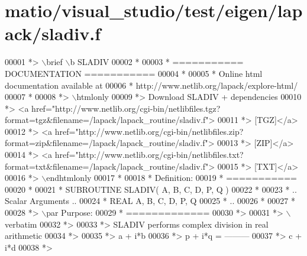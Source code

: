 \hypertarget{matio_2visual__studio_2test_2eigen_2lapack_2sladiv_8f_source}{}\section{matio/visual\+\_\+studio/test/eigen/lapack/sladiv.f}
\label{matio_2visual__studio_2test_2eigen_2lapack_2sladiv_8f_source}

\begin{DoxyCode}
00001 \textcolor{comment}{*> \(\backslash\)brief \(\backslash\)b SLADIV}
00002 \textcolor{comment}{*}
00003 \textcolor{comment}{*  =========== DOCUMENTATION ===========}
00004 \textcolor{comment}{*}
00005 \textcolor{comment}{* Online html documentation available at }
00006 \textcolor{comment}{*            http://www.netlib.org/lapack/explore-html/ }
00007 \textcolor{comment}{*}
00008 \textcolor{comment}{*> \(\backslash\)htmlonly}
00009 \textcolor{comment}{*> Download SLADIV + dependencies }
00010 \textcolor{comment}{*> <a
       href="http://www.netlib.org/cgi-bin/netlibfiles.tgz?format=tgz&filename=/lapack/lapack\_routine/sladiv.f"> }
00011 \textcolor{comment}{*> [TGZ]</a> }
00012 \textcolor{comment}{*> <a
       href="http://www.netlib.org/cgi-bin/netlibfiles.zip?format=zip&filename=/lapack/lapack\_routine/sladiv.f"> }
00013 \textcolor{comment}{*> [ZIP]</a> }
00014 \textcolor{comment}{*> <a
       href="http://www.netlib.org/cgi-bin/netlibfiles.txt?format=txt&filename=/lapack/lapack\_routine/sladiv.f"> }
00015 \textcolor{comment}{*> [TXT]</a>}
00016 \textcolor{comment}{*> \(\backslash\)endhtmlonly }
00017 \textcolor{comment}{*}
00018 \textcolor{comment}{*  Definition:}
00019 \textcolor{comment}{*  ===========}
00020 \textcolor{comment}{*}
00021 \textcolor{comment}{*       SUBROUTINE SLADIV( A, B, C, D, P, Q )}
00022 \textcolor{comment}{* }
00023 \textcolor{comment}{*       .. Scalar Arguments ..}
00024 \textcolor{comment}{*       REAL               A, B, C, D, P, Q}
00025 \textcolor{comment}{*       ..}
00026 \textcolor{comment}{*  }
00027 \textcolor{comment}{*}
00028 \textcolor{comment}{*> \(\backslash\)par Purpose:}
00029 \textcolor{comment}{*  =============}
00030 \textcolor{comment}{*>}
00031 \textcolor{comment}{*> \(\backslash\)verbatim}
00032 \textcolor{comment}{*>}
00033 \textcolor{comment}{*> SLADIV performs complex division in  real arithmetic}
00034 \textcolor{comment}{*>}
00035 \textcolor{comment}{*>                       a + i*b}
00036 \textcolor{comment}{*>            p + i*q = ---------}
00037 \textcolor{comment}{*>                       c + i*d}
00038 \textcolor{comment}{*>}

\end{DoxyCode}
